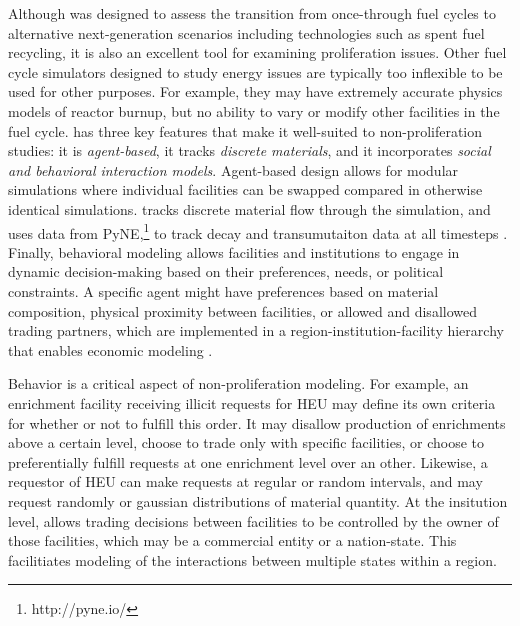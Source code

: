 Although \Cyclus was designed to assess the transition from once-through fuel cycles to alternative next-generation scenarios including technologies such as spent fuel recycling, it is also an excellent tool for examining proliferation issues.  Other fuel cycle simulators designed to study energy issues are typically too inflexible to be used for other purposes. For example, they may have extremely accurate physics models of reactor burnup, but no ability to vary or modify other facilities in the fuel cycle.  \Cyclus has three key features that make it well-suited to non-proliferation studies: it is \textit{agent-based}, it tracks \textit{discrete materials}, and it incorporates \textit{social and behavioral interaction models}. Agent-based design allows for modular simulations where individual facilities can be swapped compared in otherwise identical simulations. \Cyclus tracks discrete material flow through the simulation, and uses data from PyNE,\footnote{http://pyne.io/} to track decay and transumutaiton data at all timesteps \cite{Scopatz2012b, huff_integrated:_2013}. Finally, behavioral modeling allows facilities and institutions to engage in dynamic decision-making based on their preferences, needs, or political constraints.  A specific agent might have preferences based on material composition, physical proximity between facilities, or allowed and disallowed trading partners, which are implemented in a region-institution-facility hierarchy that enables economic modeling \cite{oliver_geniusv2:_2009}.

Behavior is a critical aspect of non-proliferation modeling. For example, an enrichment facility receiving illicit requests for \gls{HEU} may define its own criteria for whether or not to fulfill this order.  It may disallow production of enrichments above a certain level, choose to trade only with specific facilities, or choose to preferentially fulfill requests at one enrichment level over an other.  Likewise, a requestor of \gls{HEU} can make requests at regular or random intervals, and may request randomly or gaussian distributions of material quantity.  
At the insitution level, \Cyclus allows trading decisions between facilities to be controlled by the owner of those facilities, which may be a commercial entity or a nation-state.  This facilitiates modeling of the interactions between multiple states within a region.  





